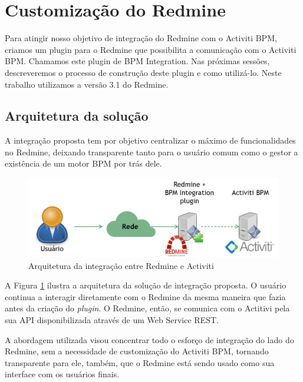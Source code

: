\section{Customização do Redmine}\label{sec:integracao_redmine_activiti-implementacao}

Para atingir nosso objetivo de integração do Redmine com o Activiti BPM, criamos um plugin para o Redmine que possibilita a comunicação com o Activiti BPM. Chamamos este plugin de BPM Integration. Nas próximas sessões, descreveremos o processo de construção deste plugin e como utilizá-lo. Neste trabalho utilizamos a versão 3.1 do Redmine\cite{redmine31}.

\subsection{Arquitetura da solução}\label{sec:integracao_redmine_activiti_implementacao-arquitetura}

A integração proposta tem por objetivo centralizar o máximo de funcionalidades no Redmine, deixando transparente tanto para o usuário comum como o gestor a existência de um motor BPM por trás dele.

\begin{figure}[H]
\centering
\includegraphics[width=1\textwidth]{imagens/arquitetura_desenvolvida_bpm_integration.png}
\caption{Arquitetura da integração entre Redmine e Activiti}
\label{fig:arquitetura_integracao_redmine_bpm}
\end{figure}

A Figura \ref{fig:arquitetura_integracao_redmine_bpm} ilustra a arquitetura da solução de integração proposta. O usuário continua a interagir diretamente com o Redmine da mesma maneira que fazia antes da criação do \textit{plugin}. O Redmine, então, se comunica com o Actitivi pela sua API disponibilizada através de um Web Service REST.

A abordagem utilizada visou concentrar todo o esforço de integração do lado do Redmine, sem a necessidade de customização do Activiti BPM, tornando transparente para ele, também, que o Redmine está sendo usado como sua interface com os usuários finais.
    
